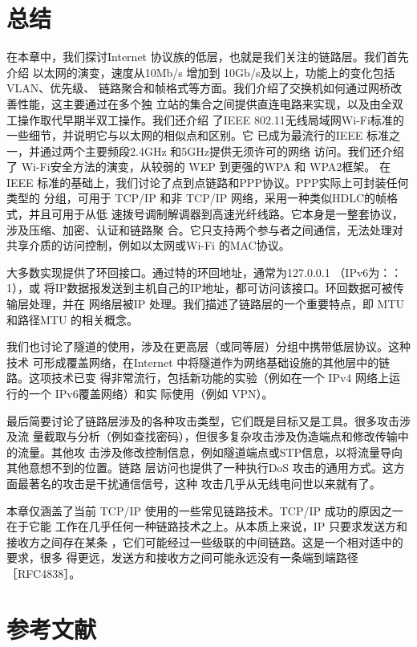 \section{总结}

在本章中，我们探讨Internet 协议族的低层，也就是我们关注的链路层。我们首先介绍
以太网的演变，速度从10Mb/s 增加到 10Gb/s及以上，功能上的变化包括VLAN、优先级、
链路聚合和帧格式等方面。我们介绍了交换机如何通过网桥改善性能，这主要通过在多个独
立站的集合之间提供直连电路来实现，以及由全双工操作取代早期半双工操作。我们还介绍
了IEEE 802.11无线局域网Wi-Fi标准的一些细节，并说明它与以太网的相似点和区别。它
已成为最流行的IEEE 标准之一，并通过两个主要频段2.4GHz 和5GHz提供无须许可的网络
访问。我们还介绍了 Wi-Fi安全方法的演变，从较弱的 WEP 到更强的WPA 和 WPA2框架。
在IEEE 标准的基础上，我们讨论了点到点链路和PPP协议。PPP实际上可封装任何类型的
分组，可用于 TCP/IP 和非 TCP/IP 网络，采用一种类似HDLC的帧格式，并且可用于从低
速拨号调制解调器到高速光纤线路。它本身是一整套协议，涉及压缩、加密、认证和链路聚
合。它只支持两个参与者之间通信，无法处理对共享介质的访问控制，例如以太网或Wi-Fi
的MAC协议。

大多数实现提供了环回接口。通过特的环回地址，通常为127.0.0.1 （IPv6为：：1），或
将IP数据报发送到主机自己的IP地址，都可访问该接口。环回数据可被传输层处理，并在
网络层被IP 处理。我们描述了链路层的一个重要特点，即 MTU 和路径MTU 的相关概念。

我们也讨论了隧道的使用，涉及在更高层（或同等层）分组中携带低层协议。这种技术
可形成覆盖网络，在Internet 中将隧道作为网络基础设施的其他层中的链路。这项技术已变
得非常流行，包括新功能的实验（例如在一个 IPv4 网络上运行的一个 IPv6覆盖网络）和实
际使用（例如 VPN）。

最后简要讨论了链路层涉及的各种攻击类型，它们既是目标又是工具。很多攻击涉及流
量截取与分析（例如查找密码），但很多复杂攻击涉及伪造端点和修改传输中的流量。其他攻
击涉及修改控制信息，例如隧道端点或STP信息，以将流量导向其他意想不到的位置。链路
层访问也提供了一种执行DoS 攻击的通用方式。这方面最著名的攻击是干扰通信信号，这种
攻击几乎从无线电问世以来就有了。

本章仅涵盖了当前 TCP/IP 使用的一些常见链路技术。TCP/IP 成功的原因之一在于它能
工作在几乎任何一种链路技术之上。从本质上来说，IP 只要求发送方和接收方之间存在某条
，它们可能经过一些级联的中间链路。这是一个相对适中的要求，很多
得更远，发送方和接收方之间可能永远没有一条端到端路径［RFC4838］。

\section{参考文献}

